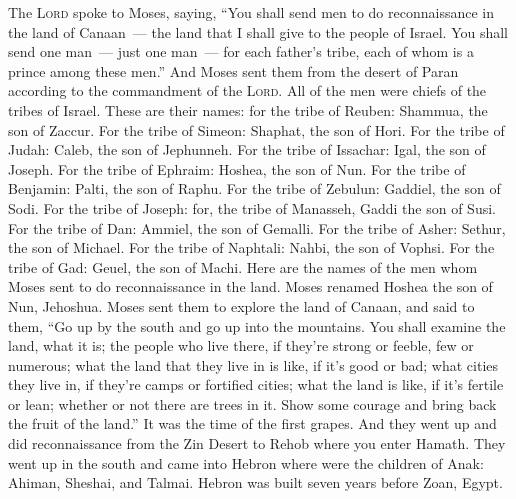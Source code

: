 
\begin{inparaenum}
   The \textsc{Lord} spoke to Moses, saying,%
   ``You shall send men to do reconnaissance in the land of Canaan~--- the land that I shall give to the people of Israel. You shall send one man~--- just one man~--- for each father's tribe, each of whom is a prince among these men.''%
   And Moses sent them from the desert of Paran according to the commandment of the \textsc{Lord}. All of the men were chiefs of the tribes of Israel.%
   These are their names: for the tribe of Reuben: Shammua, the son of Zaccur.%
   For the tribe of Simeon: Shaphat, the son of Hori.%
   For the tribe of Judah: Caleb, the son of Jephunneh.%
   For the tribe of Issachar: Igal, the son of Joseph.%
   For the tribe of Ephraim: Hoshea, the son of Nun.%
   For the tribe of Benjamin: Palti, the son of Raphu.%
   For the tribe of Zebulun: Gaddiel, the son of Sodi.%
   For the tribe of Joseph: for, the tribe of Manasseh, Gaddi the son of Susi.%
   For the tribe of Dan: Ammiel, the son of Gemalli.%
   For the tribe of Asher: Sethur, the son of Michael.%
   For the tribe of Naphtali: Nahbi, the son of Vophsi.%
   For the tribe of Gad: Geuel, the son of Machi.%
   Here are the names of the men whom Moses sent to do reconnaissance in the land. Moses renamed Hoshea the son of Nun, Jehoshua.%
   Moses sent them to explore the land of Canaan, and said to them, ``Go up by the south and go up into the mountains.%
   You shall examine the land, what it is; the people who live there, if they're strong or feeble, few or numerous;%
   what the land that they live in is like, if it's good or bad; what cities they live in, if they're camps or fortified cities;%
   what the land is like, if it's fertile or lean; whether or not there are trees in it. Show some courage and bring back the fruit of the land.'' It was the time of the first grapes.%
   And they went up and did reconnaissance from the Zin Desert to Rehob where you enter Hamath.%
   They went up in the south and came into Hebron where were the children of Anak: Ahiman, Sheshai, and Talmai. Hebron was built seven years before Zoan, Egypt.%

\end{inparaenum}
